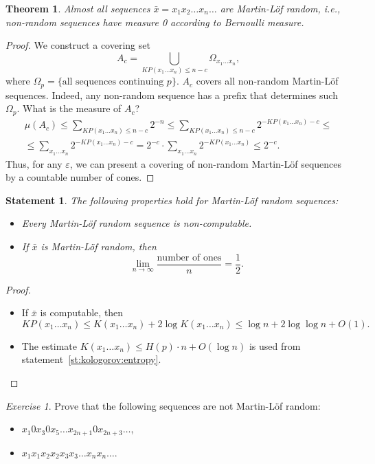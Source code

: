 \documentclass[12pt,sans]{article}
\theoremstyle{definition}
\theoremstyle{plain}
\newtheorem{theorem}{Theorem}[section]
\newtheorem{statement}{Statement}[section]
\theoremstyle{remark}
\newtheorem{exercise}{Exercise}[section]
\begin{document}
\begin{theorem}
    Almost all sequences $\bar{x} = x_1 x_2 \dotso x_n \dotso$ are Martin-Löf random, i.e., non-random sequences have measure 0 according to Bernoulli measure.
\end{theorem}
\begin{proof}
    We construct a covering set
    \[
    A_c = \bigcup_{KP(x_1 \dotso x_n) \le n - c} \Omega_{x_1 \dotso x_n},
    \]
    where $\Omega_p = \{\text{all sequences continuing $p$}\}$. $A_c$ covers all non-random Martin-Löf sequences. Indeed, any non-random sequence has a prefix that determines such $\Omega_p$. What is the measure of $A_c$?
    \begin{multline*}
        \mu(A_c) \le
        \sum_{KP(x_1 \dotso x_n) \le n - c} 2^{-n} \le
        \sum_{KP(x_1 \dotso x_n) \le n - c} 2^{-KP(x_1 \dotso x_n) - c} \le\\
        \le \sum_{x_1 \dotso x_n} 2^{-KP(x_1 \dotso x_n) - c} =
        2^{-c} \cdot \sum_{x_1 \dotso x_n} 2^{-KP(x_1 \dotso x_n)} \le 2^{-c}.
    \end{multline*}
    Thus, for any $\varepsilon$, we can present a covering of non-random Martin-Löf sequences by a countable number of cones.
\end{proof}
\begin{statement}
    The following properties hold for Martin-Löf random sequences:
    \begin{itemize}
        \item Every Martin-Löf random sequence is non-computable.
        \item If $\bar{x}$ is Martin-Löf random, then
        \[
        \lim_{n\to\infty} \frac{\text{number of ones}}{n} = \frac{1}{2}.
        \]
    \end{itemize}
\end{statement}
\begin{proof}\mbox{}
    \begin{itemize}
        \item If $\bar{x}$ is computable, then
        \[
        KP(x_1 \dotso x_n) \le K(x_1 \dotso x_n) + 2\log K(x_1 \dotso x_n) \le \log n + 2 \log \log n + O(1).
        \]
        \item The estimate $K(x_1 \dots x_n) \le H(p) \cdot n + O(\log n)$ is used from statement~\ref{st:kologorov:entropy}.
    \end{itemize}
\end{proof}

\begin{exercise}
    Prove that the following sequences are not Martin-Löf random:
    \begin{itemize}
        \item $x_1 0 x_3 0 x_5 \dotso x_{2n+1} 0 x_{2n+3} \dotso$,
        \item $x_1 x_1 x_2 x_2 x_3 x_3 \dotso x_n x_n \dotso$.
    \end{itemize}
\end{exercise}
\end{document}
